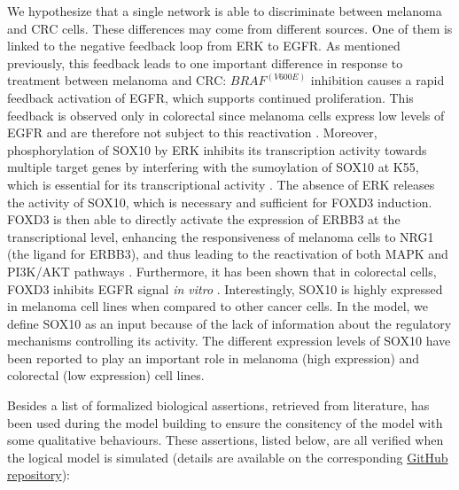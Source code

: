 \documentclass[a4paper,12pt,twoside,onecolumn,openright,final,oldfontcommands]{memoir}
\begin{document}
We hypothesize that a single network is able to discriminate between
melanoma and CRC cells. These differences may come from different
sources. One of them is linked to the negative feedback loop from ERK to
EGFR. As mentioned previously, this feedback leads to one important
difference in response to treatment between melanoma and CRC:
\(BRAF^{(V600E)}\) inhibition causes a rapid feedback activation of
EGFR, which supports continued proliferation. This feedback is observed
only in colorectal since melanoma cells express low levels of EGFR and
are therefore not subject to this reactivation
\citep{prahallad2012unresponsiveness}. Moreover, phosphorylation of
SOX10 by ERK inhibits its transcription activity towards multiple target
genes by interfering with the sumoylation of SOX10 at K55, which is
essential for its transcriptional activity \citep{han2018erk}. The
absence of ERK releases the activity of SOX10, which is necessary and
sufficient for FOXD3 induction. FOXD3 is then able to directly activate
the expression of ERBB3 at the transcriptional level, enhancing the
responsiveness of melanoma cells to NRG1 (the ligand for ERBB3), and
thus leading to the reactivation of both MAPK and PI3K/AKT pathways
\citep{han2018erk}. Furthermore, it has been shown that in colorectal
cells, FOXD3 inhibits EGFR signal \emph{in vitro} \citep{li2017foxd3}.
Interestingly, SOX10 is highly expressed in melanoma cell lines when
compared to other cancer cells. In the model, we define SOX10 as an
input because of the lack of information about the regulatory mechanisms
controlling its activity. The different expression levels of SOX10 have
been reported to play an important role in melanoma (high expression)
and colorectal (low expression) cell lines.

Besides a list of formalized biological assertions, retrieved from
literature, has been used during the model building to ensure the
consitency of the model with some qualitative behaviours. These
assertions, listed below, are all verified when the logical model is
simulated (details are available on the corresponding
\href{https://github.com/sysbio-curie/MaBoSS_test}{GitHub repository}):
\end{document}
